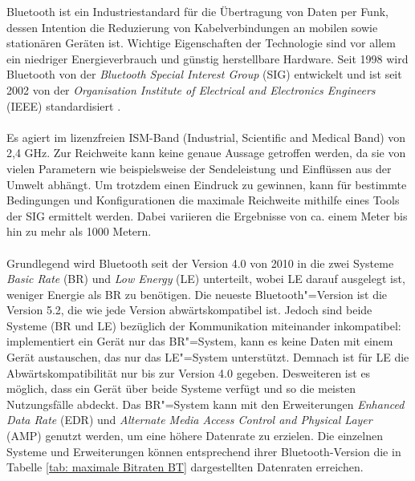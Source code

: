 Bluetooth ist ein Industriestandard für die Übertragung von Daten per Funk, dessen Intention die Reduzierung von Kabelverbindungen an mobilen sowie stationären Geräten ist. Wichtige Eigenschaften der Technologie sind vor allem ein niedriger Energieverbrauch und günstig herstellbare Hardware. Seit 1998 wird Bluetooth von der \textit{Bluetooth Special Interest Group} (SIG) entwickelt und ist seit 2002 von der \textit{Organisation Institute of Electrical and Electronics Engineers} (IEEE) standardisiert \cite{IEEE}.
\\\\
Es agiert im lizenzfreien ISM-Band (Industrial, Scientific and Medical Band) von 2,4 GHz. 
Zur Reichweite kann keine genaue Aussage getroffen werden, da sie von vielen Parametern wie beispielsweise der Sendeleistung und Einflüssen aus der Umwelt abhängt. Um trotzdem einen Eindruck zu gewinnen, kann für bestimmte Bedingungen und Konfigurationen die maximale Reichweite mithilfe eines Tools \cite{BtRangeTool} der SIG ermittelt werden. Dabei variieren die Ergebnisse von ca. einem Meter bis hin zu mehr als 1000 Metern.
\\\\
Grundlegend wird Bluetooth seit der Version 4.0 von 2010 in die zwei Systeme \textit{Basic Rate} (BR) und \textit{Low Energy} (LE) unterteilt, wobei LE darauf ausgelegt ist, weniger Energie als BR zu benötigen. Die neueste Bluetooth"=Version ist die Version 5.2, die wie jede Version abwärtskompatibel ist. Jedoch sind beide Systeme (BR und LE) bezüglich der Kommunikation miteinander inkompatibel: implementiert ein Gerät nur das BR"=System, kann es keine Daten mit einem Gerät austauschen, das nur das LE"=System unterstützt. Demnach ist für LE die Abwärtskompatibilität nur bis zur Version 4.0 gegeben. Desweiteren ist es möglich, dass ein Gerät über beide Systeme verfügt und so die meisten Nutzungsfälle abdeckt. Das BR"=System kann mit den Erweiterungen \textit{Enhanced Data Rate} (EDR) und \textit{Alternate Media Access Control and Physical Layer} (AMP) genutzt werden, um eine höhere Datenrate zu erzielen. Die einzelnen Systeme und Erweiterungen können entsprechend ihrer Bluetooth-Version die in Tabelle \ref{tab: maximale Bitraten BT} dargestellten Datenraten erreichen.
